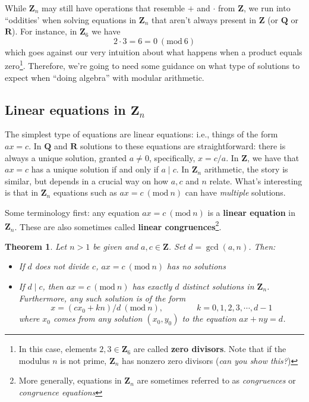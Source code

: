 \documentclass[12pt]{article}
\numberwithin{equation}{subsection}
\newtheorem{thm}[subsection]{Theorem}
\theoremstyle{note}
\newcommand{\Mod}[1]{\ (\mathrm{mod}\ #1)}
\begin{document}
While $\mathbf{Z}_n$ may still have operations that resemble $+$ and $\cdot$ from $\mathbf{Z}$, we run into ``oddities' when solving equations in $\mathbf{Z}_n$ that aren't always present in $\mathbf{Z}$ (or $\mathbf{Q}$ or $\mathbf{R}$). For instance, in $\mathbf{Z}_6$ we have \[2\cdot 3= 6=0\Mod{6}\] which goes against our very intuition about what happens when a product equals zero\footnote{In this case, elements $2,3\in\mathbf{Z}_6$ are called \textbf{zero divisors}. Note that if the modulus $n$ is not prime, $\mathbf{Z}_n$ has nonzero zero divisors (\textit{can you show this?})}. Therefore, we're going to need some guidance on what type of solutions to expect when ``doing algebra'' with modular arithmetic. 

\subsection{Linear equations in $\mathbf{Z}_n$}
The simplest type of equations are linear equations: i.e., things of the form $ax=c$. In $\mathbf{Q}$ and $\mathbf{R}$ solutions to these equations are straightforward: there is always a unique solution, granted $a\neq 0$, specifically, $x=c/a$. In $\mathbf{Z}$, we have that $ax=c$ has a unique solution if and only if $a\mid c$. In $\mathbf{Z}_n$ arithmetic, the story is similar, but depends in a crucial way on how $a,c$ and $n$ relate. What's interesting is that in $\mathbf{Z}_n$ equations such as $ax=c\Mod{n}$ can have \textit{multiple} solutions. 

Some terminology first: any equation $ax=c\Mod{n}$ is a \textbf{linear equation} in $\mathbf{Z}_n$. These are also sometimes called \textbf{linear congruences}\footnote{More generally, equations in $\mathbf{Z}_n$ are sometimes referred to as \textit{congruences} or \textit{congruence equations}}.


\begin{thm}\label{lin-cong}
	Let $n>1$ be given and $a,c\in\mathbf{Z}$. Set $d=\gcd(a,n)$. Then:
	\begin{itemize}
		\item If $d$ does not divide $c$, $ax=c\Mod{n}$ has no solutions
		\item If $d\mid c$, then $ax=c\Mod{n}$ has exactly $d$ distinct solutions in $\mathbf{Z}_n$. Furthermore, any such solution is of the form \begin{equation} \label{lin-cong-solutions} x=(cx_0+kn)/d \Mod{n}, \qquad \qquad k=0,1,2,3,\cdots,d-1\end{equation} where $x_0$ comes from any solution $(x_0,y_0)$ to the equation $ax+ny=d$.
	\end{itemize}
\end{thm}
\end{document}
